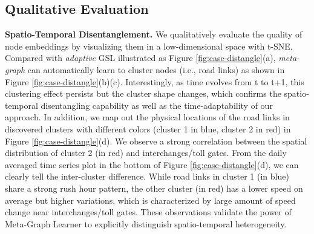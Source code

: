 \documentclass[letterpaper]{article} \usepackage{aaai23}  \usepackage{times}  \usepackage{helvet}  \usepackage{courier}  \usepackage[hyphens]{url}  \usepackage{graphicx} \urlstyle{rm} \def\UrlFont{\rm}  \usepackage{natbib}  \usepackage{caption} \usepackage{multirow}
\begin{document}
\subsection{Qualitative Evaluation} \label{sec:experiment-casestudy}
\textbf{Spatio-Temporal Disentanglement.} We qualitatively evaluate the quality of node embeddings by visualizing them in a low-dimensional space with t-SNE. Compared with \textit{adaptive} GSL illustrated as Figure \ref{fig:case-distangle}(a), \textit{meta-graph} can automatically learn to cluster nodes (i.e., road links) as shown in Figure \ref{fig:case-distangle}(b)(c). Interestingly, as time evolves from t to t+1, this clustering effect persists but the cluster shape changes, which confirms the spatio-temporal disentangling capability as well as the time-adaptability of our approach. In addition, we map out the physical locations of the road links in discovered clusters with different colors (cluster 1 in blue, cluster 2 in red) in Figure \ref{fig:case-distangle}(d). We observe a strong correlation between the spatial distribution of cluster 2 (in red) and interchanges/toll gates. From the daily averaged time series plot in the bottom of Figure \ref{fig:case-distangle}(d), we can clearly tell the inter-cluster difference. While road links in cluster 1 (in blue) share a strong rush hour pattern, the other cluster (in red) has a lower speed on average but higher variations, which is characterized by large amount of speed change near interchanges/toll gates. These observations validate the power of Meta-Graph Learner to explicitly distinguish spatio-temporal heterogeneity. 
\end{document}
